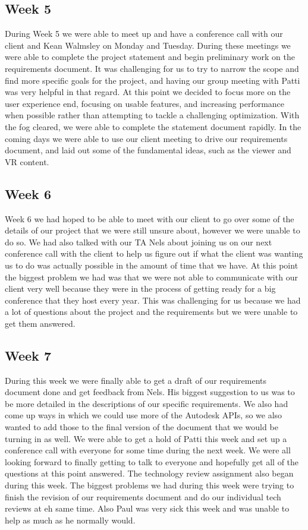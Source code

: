 \documentclass[10pt,draftclsnofoot,onecolumn]{IEEEtran}
\begin{document}
\subsection{Week 5}
During Week 5 we were able to meet up and have a conference call with our client and Kean Walmsley on Monday and Tuesday. During these meetings we were able to complete the project statement and begin preliminary work on the requirements document. It was challenging for us to try to narrow the scope and find more specific goals for the project, and having our group meeting with Patti was very helpful in that regard. At this point we decided to focus more on the user experience end, focusing on usable features, and increasing performance when possible rather than attempting to tackle a challenging optimization. With the fog cleared, we were able to complete the statement document rapidly. In the coming days we were able to use our client meeting to drive our requirements document, and laid out some of the fundamental ideas, such as the viewer and VR content.

\subsection{Week 6}
Week 6 we had hoped to be able to meet with our client to go over some of the details of our project that we were still unsure about, however we were unable to do so. We had also talked with our TA Nels about joining us on our next conference call with the client to help us figure out if what the client was wanting us to do was actually possible in the amount of time that we have. At this point the biggest problem we had was that we were not able to communicate with our client very well because they were in the process of getting ready for a big conference that they host every year. This was challenging for us because we had a lot of questions about the project and the requirements but we were unable to get them answered.

\subsection{Week 7}
During this week we were finally able to get a draft of our requirements document done and get feedback from Nels. His biggest suggestion to us was to be more detailed in the descriptions of our specific requirements. We also had come up ways in which we could use more of the Autodesk APIs, so we also wanted to add those to the final version of the document that we would be turning in as well. We were able to get a hold of Patti this week and set up a conference call with everyone for some time during the next week. We were all looking forward to finally getting to talk to everyone and hopefully get all of the questions at this point answered. The technology review assignment also began during this week. The biggest problems we had during this week were trying to finish the revision of our requirements document and do our individual tech reviews at eh same time. Also Paul was very sick this week and was unable to help as much as he normally would. 
\end{document}
